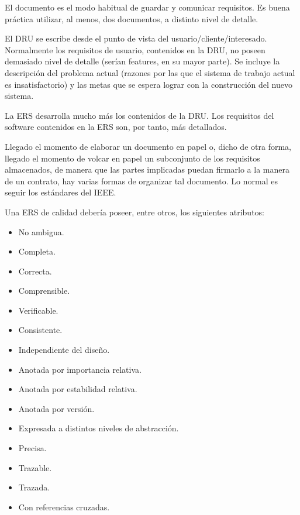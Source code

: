 El documento es el modo habitual de guardar y comunicar requisitos. Es
buena práctica utilizar, al menos, dos documentos, a distinto nivel de
detalle.

\begin{description}[noitemsep]
\item[DRU, Documento de Requisitos de Usuario (URD)] El DRU se escribe
  desde el punto de vista del usuario/cliente/interesado. Normalmente
  los requisitos de usuario, contenidos en la DRU, no poseen demasiado
  nivel de detalle (serían features, en su mayor parte). Se incluye la
  descripción del problema actual (razones por las que el sistema de
  trabajo actual es insatisfactorio) y las metas que se espera lograr
  con la construcción del nuevo sistema.
\item[ERS, Especificación de Requisitos de Software (SRS)] La ERS
  desarrolla mucho más los contenidos de la DRU. Los requisitos del
  software contenidos en la ERS son, por tanto, más detallados.
\end{description}

Llegado el momento de elaborar un documento en papel o, dicho de otra
forma, llegado el momento de volcar en papel un subconjunto de los
requisitos almacenados, de manera que las partes implicadas puedan
firmarlo a la manera de un contrato, hay varias formas de organizar
tal documento. Lo normal es seguir los estándares del IEEE.

Una ERS de calidad debería poseer, entre otros, los siguientes atributos:

\begin{itemize}[noitemsep]
\item No ambigua.
\item Completa.
\item Correcta.
\item Comprensible.
\item Verificable.
\item Consistente.
\item Independiente del diseño.
\item Anotada por importancia relativa.
\item Anotada por estabilidad relativa.
\item Anotada por versión.
\item Expresada a distintos niveles de abstracción.
\item Precisa.
\item Trazable.
\item Trazada.
\item Con referencias cruzadas.
\end{itemize}

